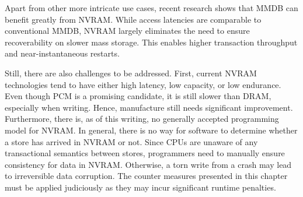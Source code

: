 Apart from other more intricate use cases, recent research shows that \ac{MMDB}
can benefit greatly from \ac{NVRAM}. While access latencies are comparable to
conventional \ac{MMDB}, \ac{NVRAM} largely eliminates the need to ensure
recoverability on slower mass storage. This enables higher transaction
throughput and near-instantaneous restarts.

Still, there are also challenges to be addressed. First, current \ac{NVRAM}
technologies tend to have either high latency, low capacity, or low endurance.
Even though \ac{PCM} is a promising candidate, it is still slower than
\ac{DRAM}, especially when writing. Hence, manufacture still needs significant
improvement. Furthermore, there is, as of this writing, no generally accepted
programming model for \ac{NVRAM}. In general, there is no way for software to
determine whether a store has arrived in \ac{NVRAM} or not. Since \ac{CPU}s are
unaware of any transactional semantics between stores, programmers need to
manually ensure consistency for data in \ac{NVRAM}. Otherwise, a torn write from
a crash may lead to irreversible data corruption. The counter measures presented
in this chapter must be applied judiciously as they may incur significant
runtime penalties.
